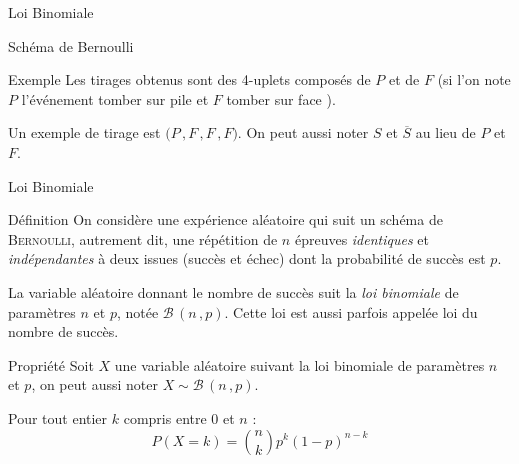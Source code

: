 \documentclass{coursbook}
\begin{document}
\begin{Gpartie}{Loi Binomiale}
\begin{Spartie}{Schéma de Bernoulli}
\begin{SSpartie}{Exemple}
                Les tirages obtenus sont des 4-uplets composés de $P$ et de $F$ (si l'on note $P$ l'événement \og tomber sur pile \fg{} et $F$ \og tomber sur face \fg{}).
                
                Un exemple de tirage est $\big(P\,, F\,, F\,, F\big)$. On peut aussi noter $S$ et $\overline{S}$ au lieu de $P$ et $F$.
            \end{SSpartie}
        \end{Spartie}
        \vfill
        \pagebreak
        \begin{Spartie}{Loi Binomiale} 
            \begin{SSpartie}{Définition} 
                On considère une expérience aléatoire qui suit un schéma de \textsc{Bernoulli}, autrement dit, une répétition de $n$ épreuves \emph{identiques} et \emph{indépendantes} à deux issues (succès et échec) dont la probabilité de succès est $p$.

                La variable aléatoire donnant le nombre de succès suit la \emph{loi binomiale} de paramètres $n$ et $p$, notée $\mathcal{B}\,\left(n\,, p\right)$. Cette loi est aussi parfois appelée loi du nombre de succès.
            \end{SSpartie}
            \begin{SSpartie}{Propriété} 
                Soit $X$ une variable aléatoire suivant la loi binomiale de paramètres $n$ et $p$, on peut aussi noter $X\sim\mathcal{B}\,\left(n\,, p\right)$.

                Pour tout entier $k$ compris entre $0$ et $n$ :
                \[\boxed{P(X=k)=\binom{n}{k}p^k(1-p)^{n-k}}\]


\end{SSpartie}
\end{Spartie}
\end{Gpartie}
\end{document}

